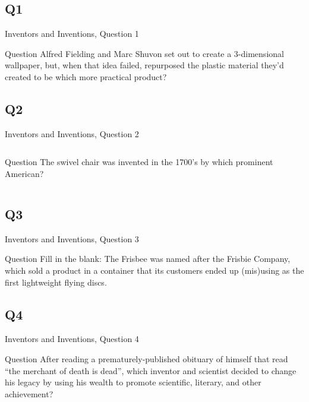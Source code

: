 \documentclass[11pt]{beamer}
\begin{document}
\subsection*{Q1}
\begin{frame}[t]{Inventors and Inventions, Question 1}
\begin{block}{Question}
Alfred Fielding and Marc Shuvon set out to create a 3-dimensional wallpaper, but, when that idea failed, repurposed the plastic material they'd created to be which more practical product?
\end{block}
\end{frame}
\subsection*{Q2}
\begin{frame}[t]{Inventors and Inventions, Question 2}
\begin{columns}[T,totalwidth=\linewidth]
\begin{column}{0.32\linewidth}
\begin{block}{Question}
The swivel chair was invented in the 1700's by which prominent American?
\end{block}
\end{column}
\begin{column}{0.65\linewidth}
\begin{center}
\texttt{[image: \{Images/swivel]}.jpg}
\end{center}
\end{column}
\end{columns}
\end{frame}
\subsection*{Q3}
\begin{frame}[t]{Inventors and Inventions, Question 3}
\begin{block}{Question}
Fill in the blank: The Frisbee was named after the Frisbie \textunderscore{}\textunderscore{}\textunderscore{}\textunderscore{}\textunderscore{} Company, which sold a product in a container that its customers ended up (mis)using as the first lightweight flying discs.
\end{block}
\end{frame}
\subsection*{Q4}
\begin{frame}[t]{Inventors and Inventions, Question 4}
\begin{block}{Question}
After reading a prematurely-published obituary of himself that read ``the merchant of death is dead'', which inventor and scientist decided to change his legacy by using his wealth to promote scientific, literary, and other achievement?
\end{block}
\end{frame}
\end{document}
